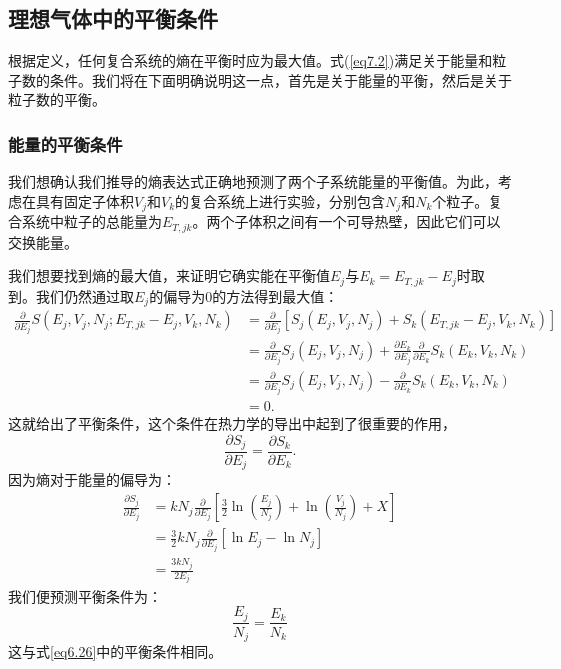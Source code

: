 \documentclass[UTF8]{ctexart}
\numberwithin{equation}{section}%
\numberwithin{figure}{section}%
\begin{document}
    \subsection{理想气体中的平衡条件}
    根据定义，任何复合系统的熵在平衡时应为最大值。式(\ref{eq7.2})满足关于能量和粒子数的条件。我们将在下面明确说明这一点，首先是关于能量的平衡，然后是关于粒子数的平衡。
    \subsubsection{能量的平衡条件}
    我们想确认我们推导的熵表达式正确地预测了两个子系统能量的平衡值。为此，考虑在具有固定子体积$V_j$和$V_k$的复合系统上进行实验，分别包含$N_j$和$N_k$个粒子。复合系统中粒子的总能量为$E_{T,jk}$。两个子体积之间有一个可导热壁，因此它们可以交换能量。

    我们想要找到熵的最大值，来证明它确实能在平衡值$E_j$与$E_k=E_{T,jk}-E_j$时取到。我们仍然通过取$E_j$的偏导为0的方法得到最大值：
    \begin{equation}
        \begin{aligned}
            \frac{\partial}{\partial E_{j}} S\left(E_{j}, V_{j}, N_{j} ; E_{T, j k}-E_{j}, V_{k}, N_{k}\right) &=\frac{\partial}{\partial E_{j}}\left[S_{j}\left(E_{j}, V_{j}, N_{j}\right)+S_{k}\left(E_{T, j k}-E_{j}, V_{k}, N_{k}\right)\right] \\
            &=\frac{\partial}{\partial E_{j}} S_{j}\left(E_{j}, V_{j}, N_{j}\right)+\frac{\partial E_{k}}{\partial E_{j}} \frac{\partial}{\partial E_{k}} S_{k}\left(E_{k}, V_{k}, N_{k}\right) \\
            &=\frac{\partial}{\partial E_{j}} S_{j}\left(E_{j}, V_{j}, N_{j}\right)-\frac{\partial}{\partial E_{k}} S_{k}\left(E_{k}, V_{k}, N_{k}\right) \\
            &=0 .
            \end{aligned}
    \end{equation}
    这就给出了平衡条件，这个条件在热力学的导出中起到了很重要的作用，
    \begin{equation}\label{eq7.5}
        \frac{\partial S_{j}}{\partial E_{j}}=\frac{\partial S_{k}}{\partial E_{k}} .
    \end{equation}
    因为熵对于能量的偏导为：
    \begin{equation}
        \begin{aligned}
            \frac{\partial S_{j}}{\partial E_{j}} &=k N_{j} \frac{\partial}{\partial E_{j}}\left[\frac{3}{2} \ln \left(\frac{E_{j}}{N_{j}}\right)+\ln \left(\frac{V_{j}}{N_{j}}\right)+X\right] \\
            &=\frac{3}{2} k N_{j} \frac{\partial}{\partial E_{j}}\left[\ln E_{j}-\ln N_{j}\right] \\
            &=\frac{3 k N_{j}}{2 E_{j}}
            \end{aligned}
    \end{equation}
    我们便预测平衡条件为：
    \begin{equation}\label{eq7.7}
        \frac{E_{j}}{N_{j}}=\frac{E_{k}}{N_{k}}
    \end{equation}
    这与式\ref{eq6.26}中的平衡条件相同。
\end{document}
